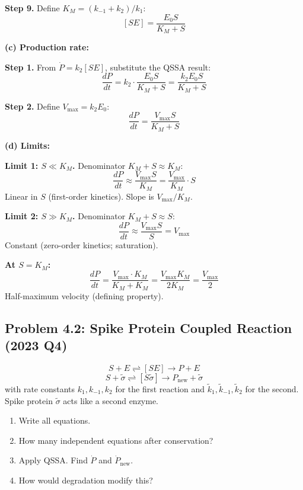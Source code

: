 \documentclass[10pt]{article}
\begin{document}
\begin{solution}
\textbf{Step 9.} Define $K_M = (k_{-1}+k_2)/k_1$:
\[
\boxed{[SE] = \frac{E_0 S}{K_M + S}}
\]

\medskip\textbf{(c) Production rate:}

\textbf{Step 1.} From $\dot P = k_2[SE]$, substitute the QSSA result:
\[
\frac{dP}{dt} = k_2\cdot\frac{E_0 S}{K_M + S} = \frac{k_2 E_0 S}{K_M + S}
\]

\textbf{Step 2.} Define $V_{\max} = k_2 E_0$:
\[
\boxed{\frac{dP}{dt} = \frac{V_{\max} S}{K_M + S}}
\]

\medskip\textbf{(d) Limits:}

\textbf{Limit 1: $S \ll K_M$.} Denominator $K_M + S \approx K_M$:
\[
\frac{dP}{dt} \approx \frac{V_{\max} S}{K_M} = \frac{V_{\max}}{K_M}\cdot S
\]
Linear in $S$ (first-order kinetics). Slope is $V_{\max}/K_M$.

\textbf{Limit 2: $S \gg K_M$.} Denominator $K_M + S \approx S$:
\[
\frac{dP}{dt} \approx \frac{V_{\max} S}{S} = V_{\max}
\]
Constant (zero-order kinetics; saturation).

\textbf{At $S = K_M$:}
\[
\frac{dP}{dt} = \frac{V_{\max}\cdot K_M}{K_M + K_M} = \frac{V_{\max} K_M}{2K_M} = \frac{V_{\max}}{2}
\]
Half-maximum velocity (defining property).
\end{solution}

\subsection{Problem 4.2: Spike Protein Coupled Reaction (2023 Q4)}

\begin{problem}
\[
S + E \rightleftharpoons [SE] \to P + E
\]
\[
S + \tilde\sigma \rightleftharpoons [S\tilde\sigma] \to P_\text{new} + \tilde\sigma
\]
with rate constants $k_1, k_{-1}, k_2$ for the first reaction and $\tilde k_1, \tilde k_{-1}, \tilde k_2$ for the second. Spike protein $\tilde\sigma$ acts like a second enzyme.
\begin{enumerate}[label=(\alph*)]
\item Write all equations.
\item How many independent equations after conservation?
\item Apply QSSA. Find $\dot P$ and $\dot P_\text{new}$.
\item How would degradation modify this?
\end{enumerate}
\end{problem}
\end{document}
